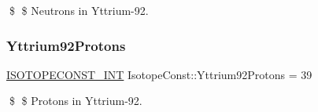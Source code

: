 \$ \$ Neutrons in Yttrium-\/92. \mbox{\label{group___isotope_const-_yttrium-_y92_ga025effd3845709e2f68dcbf9f3fd0c5a}} 
\subsubsection{\texorpdfstring{Yttrium92\+Protons}{Yttrium92Protons}}
{\footnotesize\ttfamily \mbox{\hyperlink{group___isotope_const-_macros_ga5f18360b3e99483a35c32d789e62621c}{I\+S\+O\+T\+O\+P\+E\+C\+O\+N\+S\+T\+\_\+\+I\+NT}} Isotope\+Const\+::\+Yttrium92\+Protons = 39}

\$ \$ Protons in Yttrium-\/92. 